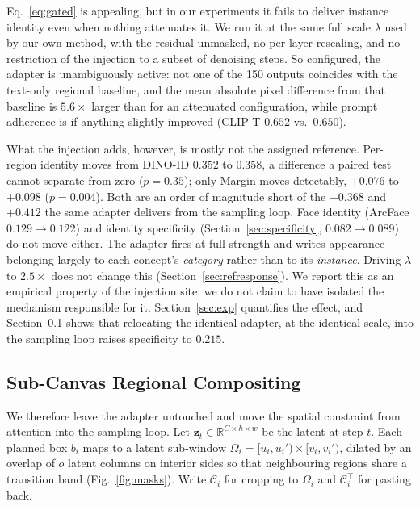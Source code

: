 \documentclass[review,10pt,times]{elsarticle}
\begin{document}
Eq.~\ref{eq:gated} is appealing, but in our experiments it fails to
deliver instance identity even when nothing attenuates it.  We run it at
the same full scale $\lambda$ used by our own method, with the residual
unmasked, no per-layer rescaling, and no restriction of the injection to
a subset of denoising steps.  So configured, the adapter is
unambiguously active: not one of the 150 outputs coincides with the
text-only regional baseline, and the mean absolute pixel difference from
that baseline is $5.6\times$ larger than for an attenuated
configuration, while prompt adherence is if anything slightly improved
(CLIP-T $0.652$ vs.\ $0.650$).

What the injection adds, however, is mostly not the assigned reference.
Per-region identity moves from DINO-ID $0.352$ to $0.358$, a difference a
paired test cannot separate from zero ($p{=}0.35$); only Margin moves
detectably, $+0.076$ to $+0.098$ ($p{=}0.004$).  Both are an order of
magnitude short of the $+0.368$ and $+0.412$ the same adapter delivers from
the sampling loop.  Face identity (ArcFace $0.129\!\to\!0.122$) and identity
specificity (Section~\ref{sec:specificity}, $0.082\!\to\!0.089$) do not move
either.  The
adapter fires at full strength and writes appearance belonging largely to
each concept's \emph{category} rather than to its \emph{instance}.  Driving
$\lambda$ to $2.5\times$ does not change this
(Section~\ref{sec:refresponse}).  We report
this as an empirical property of the injection site: we do not claim to
have isolated the mechanism responsible for it.
Section~\ref{sec:exp} quantifies the effect, and
Section~\ref{sec:subcanvas} shows that relocating the identical adapter,
at the identical scale, into the sampling loop raises specificity to
$0.215$.

\subsection{Sub-Canvas Regional Compositing}
\label{sec:subcanvas}

We therefore leave the adapter untouched and move the spatial
constraint from attention into the sampling loop.  Let
$\mathbf{z}_t\in\mathbb{R}^{C\times h\times w}$ be the latent at step
$t$.  Each planned box $b_i$ maps to a latent sub-window
$\Omega_i=[u_i,u_i')\times[v_i,v_i')$, dilated by an overlap of $o$
latent columns on interior sides so that neighbouring regions share a
transition band (Fig.~\ref{fig:masks}).  Write $\mathcal{C}_i$ for
cropping to $\Omega_i$ and $\mathcal{C}_i^{\!\top}$ for pasting back.
\end{document}
